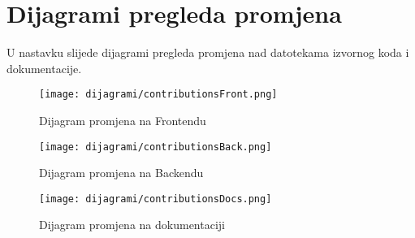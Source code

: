 \eject
\section*{Dijagrami pregleda promjena}

U nastavku slijede dijagrami pregleda promjena nad datotekama izvornog koda i dokumentacije.

\begin{figure}[H]
	\texttt{[image: dijagrami/contributionsFront.png]}
	\centering
	\caption{Dijagram promjena na Frontendu}
	\label{fig:front}
\end{figure}

\begin{figure}[H]
	\texttt{[image: dijagrami/contributionsBack.png]}
	\centering
	\caption{Dijagram promjena na Backendu}
	\label{fig:back}
\end{figure}

\begin{figure}[H]
	\texttt{[image: dijagrami/contributionsDocs.png]}
	\centering
	\caption{Dijagram promjena na dokumentaciji}
	\label{fig:docs}
\end{figure}

